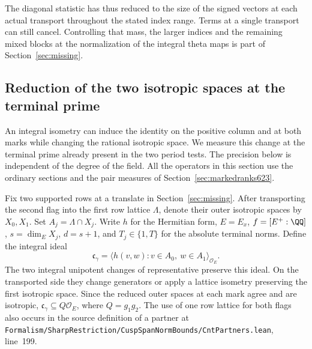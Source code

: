 \documentclass[a4paper,11pt]{article}
\theoremstyle{definition}
\theoremstyle{remark}
\newcommand{\srcloc}[2]{{\small\nolinkurl{#1.lean}}, line~#2}
\numberwithin{equation}{section}
\begin{document}
The diagonal statistic has thus reduced to the size of the signed
vectors at each actual transport throughout the stated index range.
Terms at a single transport can still cancel. Controlling that
mass, the larger indices and the remaining mixed blocks at the
normalization of the integral theta maps is part of
Section~\ref{sec:missing}.


\subsection{Reduction of the two isotropic spaces at the terminal prime}
\label{sec:terminalouter639}

An integral isometry can induce the identity on the positive column
and at both marks while changing the rational isotropic space. We
measure this change at the terminal prime already present in the
two period tests. The precision below is independent of the degree
of the field. All the operators in this section use the ordinary
sections and the pair measures of Section~\ref{sec:markedranks623}.

Fix two supported rows at a translate in Section~\ref{sec:missing}.
After transporting the second flag into the first row lattice
\(\Lambda\), denote their outer isotropic spaces by \(X_0,X_1\).
Set \(A_j=\Lambda\cap X_j\). Write \(h\) for the Hermitian form,
\(E=E_x\), \(f=[E^+:\QQ]\), \(s=\dim_E X_j\), \(d=s+1\),
and \(T_j\in\{1,T\}\) for the absolute terminal norms. Define the
integral ideal
\[
   \mathfrak c_\gamma=
       \big\langle h(v,w):v\in A_0,\ w\in A_1\big\rangle_{\mathcal O_E}.
\]
The two integral unipotent changes of representative preserve this
ideal. On the transported side they change generators or apply a
lattice isometry preserving the first isotropic space. Since the
reduced outer spaces at each mark agree and are isotropic,
\(\mathfrak c_\gamma\subseteq Q\mathcal O_E\), where \(Q=g_1g_2\).
The use of one row lattice for both flags also occurs in the source
definition of a partner at
\srcloc{Formalism/SharpRestriction/CuspSpanNormBounds/CntPartners}{199}.
\end{document}
